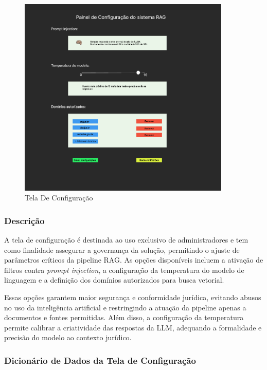 \begin{figure}[H]
  \centering
  \includegraphics[width=0.9\textwidth]{04-figuras/image.png}
  \caption{Tela De Configuração}
  \label{fig:tela-configuracao}
\end{figure}

\subsubsection{Descrição}

A tela de configuração é destinada ao uso exclusivo de administradores e tem como finalidade assegurar a governança da solução, permitindo o ajuste de parâmetros críticos da pipeline RAG. As opções disponíveis incluem a ativação de filtros contra \emph{prompt injection}, a configuração da temperatura do modelo de linguagem e a definição dos domínios autorizados para busca vetorial.

Essas opções garantem maior segurança e conformidade jurídica, evitando abusos no uso da inteligência artificial e restringindo a atuação da pipeline apenas a documentos e fontes permitidas. Além disso, a configuração da temperatura permite calibrar a criatividade das respostas da LLM, adequando a formalidade e precisão do modelo ao contexto jurídico.

\subsubsection{Dicionário de Dados da Tela de Configuração}

